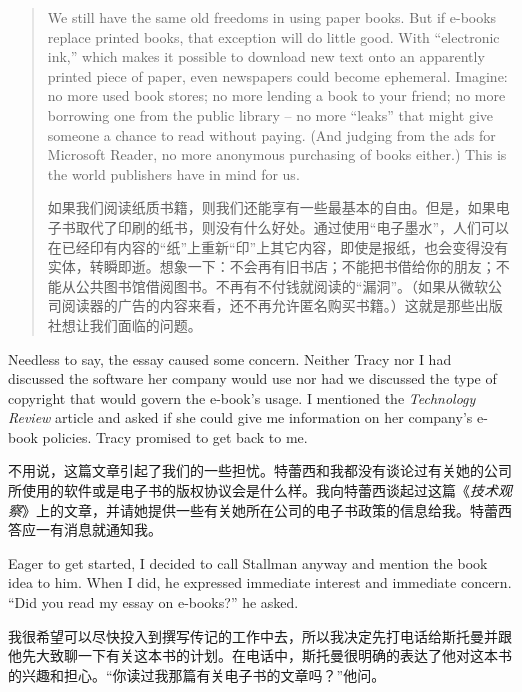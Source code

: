 \begin{quote}
\ifdefined\eng
We still have the same old freedoms in using paper books. But if e-books replace printed books, that exception will do little good. With ``electronic ink,'' which makes it possible to download new text onto an apparently printed piece of paper, even newspapers could become ephemeral. Imagine: no more used book stores; no more lending a book to your friend; no more borrowing one from the public library -- no more ``leaks'' that might give someone a chance to read without paying. (And judging from the ads for Microsoft Reader, no more anonymous purchasing of books either.) This is the world publishers have in mind for us.
\fi

\ifdefined\chs
如果我们阅读纸质书籍，则我们还能享有一些最基本的自由。但是，如果电子书取代了印刷的纸书，则没有什么好处。通过使用``电子墨水''，人们可以在已经印有内容的``纸''上重新``印''上其它内容，即使是报纸，也会变得没有实体，转瞬即逝。想象一下：不会再有旧书店；不能把书借给你的朋友；不能从公共图书馆借阅图书。不再有不付钱就阅读的``漏洞''。（如果从微软公司阅读器的广告的内容来看，还不再允许匿名购买书籍。）这就是那些出版社想让我们面临的问题。
\fi
\end{quote}

\ifdefined\eng
Needless to say, the essay caused some concern. Neither Tracy nor I had discussed the software her company would use nor had we discussed the type of copyright that would govern the e-book's usage. I mentioned the \textit{Technology Review} article and asked if she could give me information on her company's e-book policies. Tracy promised to get back to me.
\fi

\ifdefined\chs
不用说，这篇文章引起了我们的一些担忧。特蕾西和我都没有谈论过有关她的公司所使用的软件或是电子书的版权协议会是什么样。我向特蕾西谈起过这篇《\textit{技术观察}》上的文章，并请她提供一些有关她所在公司的电子书政策的信息给我。特蕾西答应一有消息就通知我。
\fi

\ifdefined\eng
Eager to get started, I decided to call Stallman anyway and mention the book idea to him. When I did, he expressed immediate interest and immediate concern. ``Did you read my essay on e-books?'' he asked.
\fi

\ifdefined\chs
我很希望可以尽快投入到撰写传记的工作中去，所以我决定先打电话给斯托曼并跟他先大致聊一下有关这本书的计划。在电话中，斯托曼很明确的表达了他对这本书的兴趣和担心。``你读过我那篇有关电子书的文章吗？''他问。
\fi

